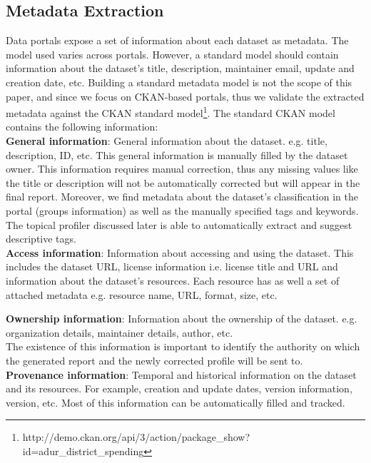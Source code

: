 \documentclass[runningheads,a4paper]{llncs}
\begin{document}
\subsection{Metadata Extraction}

Data portals expose a set of information about each dataset as metadata. The model used varies across portals. However, a standard model should contain information about the dataset's title, description, maintainer email, update and creation date, etc. Building a standard metadata model is not the scope of this paper, and since we focus on CKAN-based portals, thus we validate the extracted metadata against the CKAN standard model\footnote{http://demo.ckan.org/api/3/action/package\_show?id=adur\_district\_spending}.  The standard CKAN model contains the following information:\\

\textbf{General information}: General information about the dataset. e.g. title, description, ID, etc. This general information is manually filled by the dataset owner. This information requires manual correction, thus any missing values like the title or description will not be automatically corrected but will appear in the final report. Moreover, we find metadata about the dataset's classification in the portal (groups information) as well as the manually specified tags and keywords. The topical profiler discussed later is able to automatically extract and suggest descriptive tags.\\

\textbf{Access information}: Information about accessing and using the dataset. This includes the dataset URL, license information i.e. license title and URL and information about the dataset's resources. Each resource has as well a set of attached metadata e.g. resource name, URL, format, size, etc.

\textbf{Ownership information}: Information about the ownership of the dataset. e.g. organization details, maintainer details, author, etc.\\ The existence of this information is important to identify the authority on which the generated report and the newly corrected profile will be sent to.\\

\textbf{Provenance information}: Temporal and historical information on the dataset and its resources. For example, creation and update dates, version information, version, etc. Most of this information can be automatically filled and tracked.\\
\end{document}

